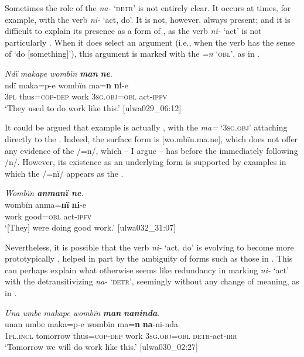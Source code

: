 Sometimes the role of the  \textit{na-} \textsc{‘detr’} is not entirely clear. It occurs at times, for example, with the verb \textit{ni-} ‘act, do’. It is not, however, always present; and it is difficult to explain its presence as a form of , as the verb \textit{ni-} ‘act’ is not particularly . When it does select an argument (i.e., when the verb has the sense of ‘do [something]’), this argument is marked with the  \textit{=n} \textsc{‘obl’}, as in .

\ea%
    \label{ex:syntax:318}
          \textit{Ndï makape wombïn} \textbf{\textit{man}} \textbf{\textit{ne}}.\\
\gll ndï  maka=p-e    wombïn  ma=\textbf{n}      \textbf{ni}{}-e\\
    3\textsc{pl}  thus=\textsc{cop-dep}  work    3\textsc{sg.obj=obl}  act-\textsc{ipfv}\\
\glt `They used to do work like this.’ [ulwa029\_06:12]
\z

It could be argued that example  is actually , with the  \textit{ma=} \textsc{‘3sg.obj’} attaching directly to the . Indeed, the surface form is [wo.mbïn.ma.ne], which does not offer any  evidence of the  /=n/, which -- I argue -- has  before the immediately following /n/. However, its existence as an underlying form is supported by examples in which the  /=nï/ appears as the  .

\ea%
    \label{ex:syntax:319}
          \textit{Wombïn \textbf{anmanï ne}.}\\
\gll wombïn  anma=\textbf{nï}  \textbf{ni}{}-e\\
    work    good=\textsc{obl}  act-\textsc{ipfv}\\
\glt `[They] were doing good work.’ [ulwa032\_31:07]
\z

Nevertheless, it is possible that the verb \textit{ni-} ‘act, do’ is evolving to become more prototypically , helped in part by the  ambiguity of forms such as those in . This can perhaps explain what otherwise seems like redundancy in marking \textit{ni-} ‘act’ with the detransitivizing  \textit{na-} \textsc{‘detr’}, seemingly without any change of meaning, as in .

\ea%
    \label{ex:syntax:320}
          \textit{Una umbe makape wombïn} \textbf{\textit{man}} \textbf{\textit{naninda}}.\\
\gll unan    umbe    maka=p-e    wombïn  ma=\textbf{n} \textbf{na}{}-ni-nda\\
    1\textsc{pl.incl}  tomorrow  thus=\textsc{cop-dep}  work    3\textsc{sg.obj=obl}    \textsc{detr}{}-act-\textsc{irr}\\
\glt `Tomorrow we will do work like this.’ [ulwa030\_02:27]
\z

